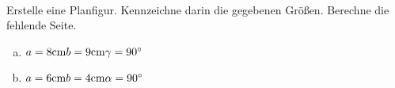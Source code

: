 \begin{aufgabe} ~ \\ 
Erstelle eine Planfigur. Kennzeichne darin die gegebenen Größen. Berechne die fehlende Seite.\begin{enumerate}[a)] 
\item 
$a=8 \mathrm{cm} \\b=9 \mathrm{cm} \\\gamma=90^{\circ} \\$
\item 
$a=6 \mathrm{cm} \\b=4 \mathrm{cm} \\\alpha=90^{\circ} \\$
\end{enumerate} 
\end{aufgabe} 
